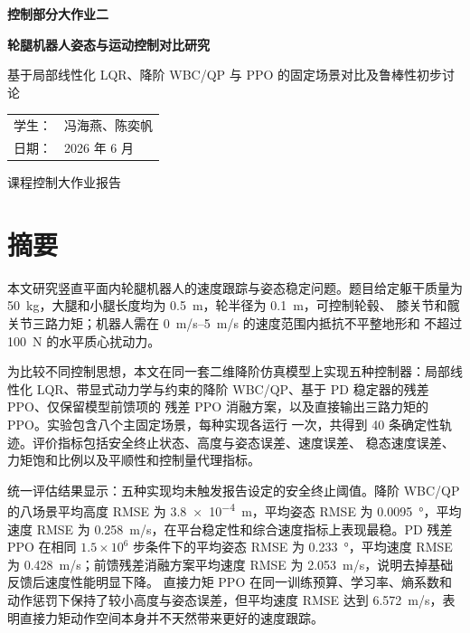 \documentclass[UTF8,12pt,a4paper,fontset=none]{ctexart}
\begin{document}
\begin{titlepage}
  \centering
  \vspace*{2.0cm}
  {\bfseries 控制部分大作业二\par}
  \vspace{1.0cm}
  {\bfseries 轮腿机器人姿态与运动控制对比研究\par}
  \vspace{0.8cm}
  { 基于局部线性化 LQR、降阶 WBC/QP 与 PPO 的固定场景对比及鲁棒性初步讨论\par}
  \vfill
  \begin{tabular}{rl}
    学生：& 冯海燕、陈奕帆\\[0.4em]
    日期：& 2026 年 6 月
  \end{tabular}
  \vfill
  {\large 课程控制大作业报告\par}
\end{titlepage}


\section*{摘要}
本文研究竖直平面内轮腿机器人的速度跟踪与姿态稳定问题。题目给定躯干质量为
\SI{50}{kg}，大腿和小腿长度均为 \SI{0.5}{m}，轮半径为 \SI{0.1}{m}，可控制轮毂、
膝关节和髋关节三路力矩；机器人需在 \SI{0}{m/s}--\SI{5}{m/s} 的速度范围内抵抗不平整地形和
不超过 \SI{100}{N} 的水平质心扰动力。

为比较不同控制思想，本文在同一套二维降阶仿真模型上实现五种控制器：局部线性化
LQR、带显式动力学与约束的降阶 WBC/QP、基于 PD 稳定器的残差 PPO、仅保留模型前馈项的
残差 PPO 消融方案，以及直接输出三路力矩的 PPO。实验包含八个主固定场景，每种实现各运行
一次，共得到 40 条确定性轨迹。评价指标包括安全终止状态、高度与姿态误差、速度误差、
稳态速度误差、力矩饱和比例以及平顺性和控制量代理指标。

统一评估结果显示：五种实现均未触发报告设定的安全终止阈值。降阶 WBC/QP 的八场景平均高度 RMSE 为
\SI{3.8e-4}{m}，平均姿态 RMSE 为 \SI{0.0095}{\degree}，平均速度 RMSE 为
\SI{0.258}{m/s}，在平台稳定性和综合速度指标上表现最稳。PD 残差 PPO 在相同
$1.5\times10^6$ 步条件下的平均姿态 RMSE 为 \SI{0.233}{\degree}，平均速度 RMSE 为
\SI{0.428}{m/s}；前馈残差消融方案平均速度 RMSE 为 \SI{2.053}{m/s}，说明去掉基础反馈后速度性能明显下降。
直接力矩 PPO 在同一训练预算、学习率、熵系数和动作惩罚下保持了较小高度与姿态误差，但平均速度 RMSE 达到
\SI{6.572}{m/s}，表明直接力矩动作空间本身并不天然带来更好的速度跟踪。
\end{document}
